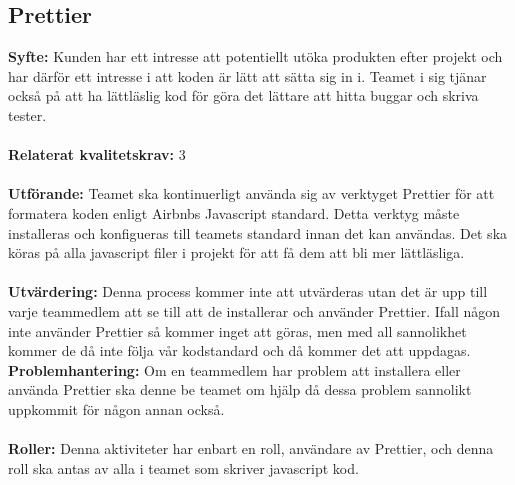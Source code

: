 \documentclass[10pt]{article}
\begin{document}
	
	
	\subsection{Prettier}
	\textbf{Syfte:}	Kunden har ett intresse att potentiellt utöka produkten efter projekt och har därför ett intresse i att koden är lätt att sätta sig in i. Teamet i sig tjänar också på att ha lättläslig kod för göra det lättare att hitta buggar och skriva tester.
	\\\\
	\textbf{Relaterat kvalitetskrav:} 3
	\\\\
	\textbf{Utförande:} Teamet ska kontinuerligt använda sig av verktyget Prettier för att formatera koden enligt Airbnbs Javascript standard\cite{bib-airbnb}. Detta verktyg måste installeras och konfigueras till teamets standard innan det kan användas. Det ska köras på alla javascript filer i projekt för att få dem att bli mer lättläsliga.
	\\\\
	\textbf{Utvärdering:} Denna process kommer inte att utvärderas utan det är upp till varje teammedlem att se till att de installerar och använder Prettier. Ifall någon inte använder Prettier så kommer inget att göras, men med all sannolikhet kommer de då inte följa vår kodstandard och då kommer det att uppdagas. 
	\textbf{Problemhantering:} Om en teammedlem har problem att installera eller använda Prettier ska denne be teamet om hjälp då dessa problem sannolikt uppkommit för någon annan också.
	\\\\
	\textbf{Roller:} Denna aktiviteter har enbart en roll, användare av Prettier, och denna roll ska antas av alla i teamet som skriver javascript kod.
	
	
\end{document}
